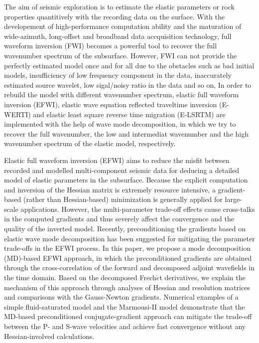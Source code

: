 \begin{eabstract}
	The aim of seismic exploration is to estimate the elastic parameters or rock properties
	quantitively                                              
	with the recording data on the surface. With the developement of 
	high-performance computation ability and the
	maturation of wide-azimuth, long-offset and broadband data accquisition 
	technology, full waveform inversion (FWI) becomes a powerful tool to recover the full
	 wavenumber spectrum of the subsurface. However, FWI can not provide the perfectly estimated
	model
	once and for all due to the obstacles such as bad initial models,
	insufficiency of low frequency component in the data, inaccurately estimated source
	wavelet, low sigal/noisy ratio in the data and so on,
	In order to rebuild the model with different wavenumber spectrum, elastic full waveform
	inversion (EFWI), elastic wave equation 
	reflected traveltime inversion (E-WERTI) and elastic least square reverse time
	migration (E-LSRTM) are implemented with the help of wave mode decomposition, in which we
	try to recover the full wavenumber, the low and intermediat wavenumber
	and the high wavenumber spectrum of the elastic model, respectively.

Elastic full waveform inversion (EFWI) aims to reduce the misfit between recorded and modelled multi-component
seismic data for deducing a detailed model of elastic parameters in the subsurface.
Because the explicit computation and inversion of the Hessian matrix
is extremely resource intensive,
a gradient-based (rather than Hessian-based) minimization is generally applied for large-scale applications.
However, the multi-parameter trade-off effects cause cross-talks in the computed gradients and
thus severely affect the convergence and the quality of the inverted model.
Recently, preconditioning the gradients based on elastic wave mode decomposition
has been suggested for mitigating the parameter trade-offs in the EFWI process.
In this paper, we propose a mode decomposition (MD)-based EFWI approach, in which the preconditioned gradients
are obtained through the cross-correlation of the forward and
decomposed adjoint wavefields in the time domain.
Based on the decomposed Frech{$\acute{e}$}t derivatives,
we explain the mechanism of this approach through analyses of Hessian and resolution matrices
and comparisons with the Gauss-Newton gradients.
Numerical examples of a simple fluid-saturated model and the Marmousi-II model
demonstrate that the MD-based preconditioned conjugate-gradient approach
can mitigate the trade-off between the P- and S-wave velocities and achieve fast
convergence without any Hessian-involved calculations.


\end{eabstract}
